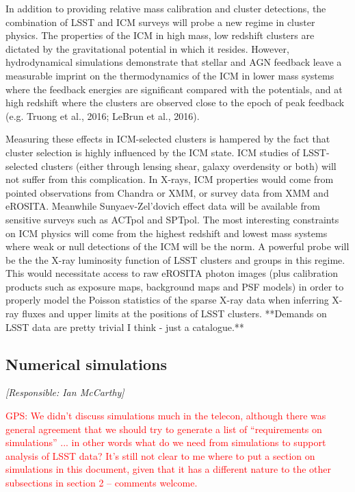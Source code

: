 \documentclass[a4paper,11pt]{article}
\newcommand{\red}{\textcolor{red}}
\begin{document}
In addition to providing relative mass calibration and cluster
detections, the combination of LSST and ICM surveys will probe a new
regime in cluster physics. The properties of the ICM in high mass, low
redshift clusters are dictated by the gravitational potential in which
it resides. However, hydrodynamical simulations demonstrate that
stellar and AGN feedback leave a measurable imprint on the
thermodynamics of the ICM in lower mass systems where the feedback
energies are significant compared with the potentials, and at high
redshift where the clusters are observed close to the epoch of peak
feedback (e.g. Truong et al., 2016; LeBrun et al., 2016).

Measuring these effects in ICM-selected clusters is hampered by the
fact that cluster selection is highly influenced by the ICM state. ICM
studies of LSST-selected clusters (either through lensing shear,
galaxy overdensity or both) will not suffer from this complication. In
X-rays, ICM properties would come from pointed observations from
Chandra or XMM, or survey data from XMM and eROSITA. Meanwhile
Sunyaev-Zel'dovich effect data will be available from sensitive
surveys such as ACTpol and SPTpol. The most interesting constraints on
ICM physics will come from the highest redshift and lowest mass
systems where weak or null detections of the ICM will be the norm. A
powerful probe will be the the X-ray luminosity function of LSST
clusters and groups in this regime. This would necessitate access to
raw eROSITA photon images (plus calibration products such as exposure
maps, background maps and PSF models) in order to properly model the
Poisson statistics of the sparse X-ray data when inferring X-ray
fluxes and upper limits at the positions of LSST clusters. **Demands
on LSST data are pretty trivial I think - just a catalogue.**


\subsection{Numerical simulations}\label{sec:sims}

{\it [Responsible: Ian McCarthy]}

\noindent\red{GPS: We didn't discuss simulations much in the telecon,
  although there was general agreement that we should try to generate
  a list of ``requirements on simulations'' ... in other words what do
  we need from simulations to support analysis of LSST data?  It's
  still not clear to me where to put a section on simulations in this
  document, given that it has a different nature to the other
  subsections in section 2 -- comments welcome.}
\end{document}
